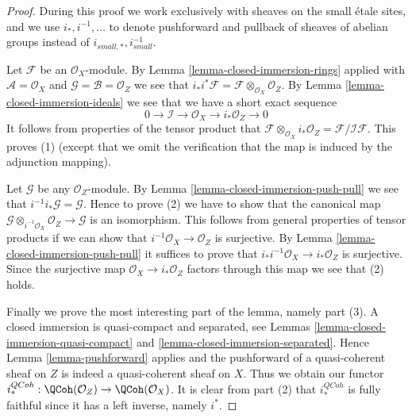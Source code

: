 \begin{proof}
During this proof we work exclusively with sheaves on
the small \'etale sites, and we use $i_*, i^{-1}, \ldots$
to denote pushforward and pullback of sheaves of abelian groups
instead of $i_{small, *}, i_{small}^{-1}$.

\medskip\noindent
Let $\mathcal{F}$ be an $\mathcal{O}_X$-module. By
Lemma \ref{lemma-closed-immersion-rings} applied with
$\mathcal{A} = \mathcal{O}_X$ and
$\mathcal{G} = \mathcal{B} = \mathcal{O}_Z$ we see that
$i_*i^*\mathcal{F} = \mathcal{F} \otimes_{\mathcal{O}_X} \mathcal{O}_Z$.
By
Lemma \ref{lemma-closed-immersion-ideals}
we see that we have a short exact sequence
$$
0 \to \mathcal{I} \to \mathcal{O}_X \to i_*\mathcal{O}_Z \to 0
$$
It follows from properties of the tensor product that
$\mathcal{F} \otimes_{\mathcal{O}_X} i_*\mathcal{O}_Z
= \mathcal{F}/\mathcal{I}\mathcal{F}$. This proves (1) (except
that we omit the verification that the map is induced by the
adjunction mapping).

\medskip\noindent
Let $\mathcal{G}$ be any $\mathcal{O}_Z$-module. By
Lemma \ref{lemma-closed-immersion-push-pull}
we see that $i^{-1}i_*\mathcal{G} = \mathcal{G}$.
Hence to prove (2) we have to show that the canonical map
$\mathcal{G} \otimes_{i^{-1}\mathcal{O}_X} \mathcal{O}_Z \to \mathcal{G}$
is an isomorphism. This follows from general properties of tensor products
if we can show that $i^{-1}\mathcal{O}_X \to \mathcal{O}_Z$ is surjective. By
Lemma \ref{lemma-closed-immersion-push-pull}
it suffices to prove that
$i_*i^{-1}\mathcal{O}_X \to i_*\mathcal{O}_Z$
is surjective. Since the surjective map $\mathcal{O}_X \to i_*\mathcal{O}_Z$
factors through this map we see that (2) holds.

\medskip\noindent
Finally we prove the most interesting part of the lemma, namely part (3).
A closed immersion is quasi-compact and separated, see
Lemmas \ref{lemma-closed-immersion-quasi-compact} and
\ref{lemma-closed-immersion-separated}. Hence
Lemma \ref{lemma-pushforward}
applies and the pushforward of a quasi-coherent
sheaf on $Z$ is indeed a quasi-coherent sheaf on $X$.
Thus we obtain our functor
$i^{QCoh}_* : \QCoh(\mathcal{O}_Z)
\to \QCoh(\mathcal{O}_X)$.
It is clear from part (2) that $i^{QCoh}_*$ is fully faithful since
it has a left inverse, namely $i^*$.


\end{proof}
